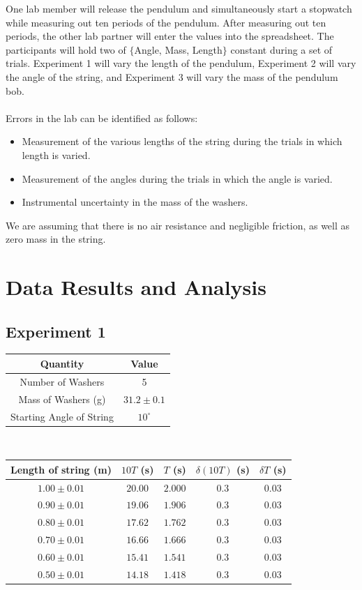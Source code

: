 \documentclass[10pt]{extarticle}
\begin{document}
{One lab member will release the pendulum and simultaneously start a stopwatch while measuring out ten periods of the pendulum. After measuring out ten periods, the other lab partner will enter the values into the spreadsheet. The participants will hold two of $\{$Angle, Mass, Length$\}$ constant during a set of trials. Experiment 1 will vary the length of the pendulum, Experiment 2 will vary the angle of the string, and Experiment 3 will vary the mass of the pendulum bob.\\
\\
Errors in the lab can be identified as follows:
  \begin{itemize}
    \item Measurement of the various lengths of the string during the trials in which length is varied.
    \item Measurement of the angles during the trials in which the angle is varied.
    \item Instrumental uncertainty in the mass of the washers. 
  \end{itemize}
 We are assuming that there is no air resistance and negligible friction, as well as zero mass in the string.
\section*{Data Results and Analysis}
\subsection*{Experiment 1}
\begin{center}
	\renewcommand{\arraystretch}{1.5}
	\begin{tabular}{c|c}
	Quantity & Value\\
	\hline
	Number of Washers & 5\\
	Mass of Washers (g) & $31.2\pm 0.1$ \\
	Starting Angle of String & $10^{\circ}$
	\end{tabular}\\
	\vspace*{10pt}
	\begin{tabular}{c|c|c|c|c}
		Length of string (m) & $10T$ (s) & $T$ (s) & $\delta (10T)$ (s) & $\delta T$ (s) \\
		\hline
		$1.00\pm 0.01$ & $20.00$ & $2.000$ & $0.3$ & $0.03$ \\
		$0.90\pm 0.01$ & $19.06$ & $1.906$ & $0.3$ & $0.03$ \\
		$0.80\pm 0.01$ & $17.62$ & $1.762$ & $0.3$ & $0.03$ \\
		$0.70\pm 0.01$ & $16.66$ & $1.666$ & $0.3$ & $0.03$ \\
		$0.60\pm 0.01$ & $15.41$ & $1.541$ & $0.3$ & $0.03$ \\
		$0.50\pm 0.01$ & $14.18$ & $1.418$ & $0.3$ & $0.03$
	\end{tabular}
\end{center}
}
\end{document}
